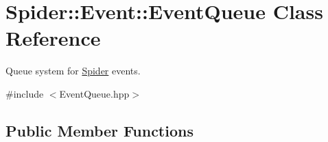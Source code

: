 \hypertarget{class_spider_1_1_event_1_1_event_queue}{}\section{Spider\+:\+:Event\+:\+:Event\+Queue Class Reference}
\label{class_spider_1_1_event_1_1_event_queue}


Queue system for \hyperlink{namespace_spider}{Spider} events.  




{\ttfamily \#include $<$Event\+Queue.\+hpp$>$}

\subsection*{Public Member Functions}
